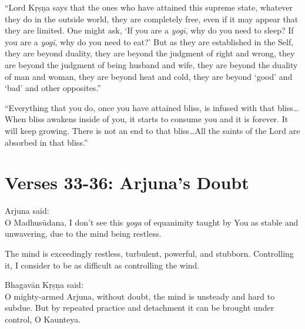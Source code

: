\enquote{Lord Kṛṣṇa says that the ones who have attained this supreme state, whatever they do in the outside world, they are completely free, even if it may appear that they are limited. One might ask, \enquote{If you are a \textit{yogī}, why do you need to sleep? If you are a \textit{yogī}, why do you need to eat?} But as they are established in the Self, they are beyond duality, they are beyond the judgment of right and wrong, they are beyond the judgment of being husband and wife, they are beyond the duality of man and woman, they are beyond heat and cold, they are beyond \enquote{good} and \enquote{bad} and other opposites.}

\enquote{Everything that you do, once you have attained bliss, is infused with that bliss\ldots When bliss awakens inside of you, it starts to consume you and it is forever. It will keep growing. There is not an end to that bliss\ldots All the saints of the Lord are absorbed in that bliss.}

\section{Verses 33-36: Arjuna's Doubt}\label{sec-verses-33-36-arjuna-s-doubt}

{\hspace*{1em}Arjuna said: \\
O Madhusūdana, I don't see this \textit{yoga} of equanimity taught by You as stable and unwavering, due to the mind being restless.}

{The mind is exceedingly restless, turbulent, powerful, and stubborn. Controlling it, I consider to be as difficult as controlling the wind.}

{\hspace*{1em}Bhagavān Kṛṣṇa said: \\
O mighty-armed Arjuna, without doubt, the mind is unsteady and hard to subdue. But by repeated practice and detachment it can be brought under control, O Kaunteya.}

